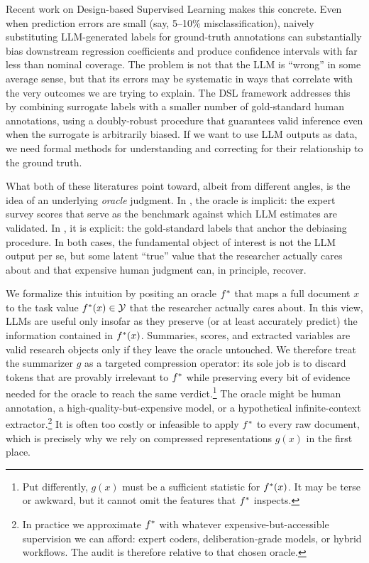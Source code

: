 Recent work on Design-based Supervised Learning \citep{EgamiEtAl2024} makes this concrete. Even when prediction errors are small (say, 5--10\% misclassification), naively substituting LLM-generated labels for ground-truth annotations can substantially bias downstream regression coefficients and produce confidence intervals with far less than nominal coverage. The problem is not that the LLM is ``wrong'' in some average sense, but that its errors may be systematic in ways that correlate with the very outcomes we are trying to explain. The DSL framework addresses this by combining surrogate labels with a smaller number of gold-standard human annotations, using a doubly-robust procedure that guarantees valid inference even when the surrogate is arbitrarily biased. If we want to use LLM outputs as data, we need formal methods for understanding and correcting for their relationship to the ground truth.

What both of these literatures point toward, albeit from different angles, is the idea of an underlying \emph{oracle} judgment. In \citet{BenoitEtAl2025}, the oracle is implicit: the expert survey scores that serve as the benchmark against which LLM estimates are validated. In \citet{EgamiEtAl2024}, it is explicit: the gold-standard labels that anchor the debiasing procedure. In both cases, the fundamental object of interest is not the LLM output per se, but some latent ``true'' value that the researcher actually cares about and that expensive human judgment can, in principle, recover.

We formalize this intuition by positing an oracle $f^{\ast}$ that maps a full document $x$ to the task value $f^{\ast}(x) \in \mathcal{Y}$ that the researcher actually cares about. In this view, LLMs are useful only insofar as they preserve (or at least accurately predict) the information contained in $f^{\ast}(x)$. Summaries, scores, and extracted variables are valid research objects only if they leave the oracle untouched. We therefore treat the summarizer $g$ as a targeted compression operator: its sole job is to discard tokens that are provably irrelevant to $f^{\ast}$ while preserving every bit of evidence needed for the oracle to reach the same verdict.\footnote{Put differently, $g(x)$ must be a sufficient statistic for $f^{\ast}(x)$. It may be terse or awkward, but it cannot omit the features that $f^{\ast}$ inspects.} The oracle might be human annotation, a high-quality-but-expensive model, or a hypothetical infinite-context extractor.\footnote{In practice we approximate $f^{\ast}$ with whatever expensive-but-accessible supervision we can afford: expert coders, deliberation-grade models, or hybrid workflows. The audit is therefore relative to that chosen oracle.} It is often too costly or infeasible to apply $f^{\ast}$ to every raw document, which is precisely why we rely on compressed representations $g(x)$ in the first place.

